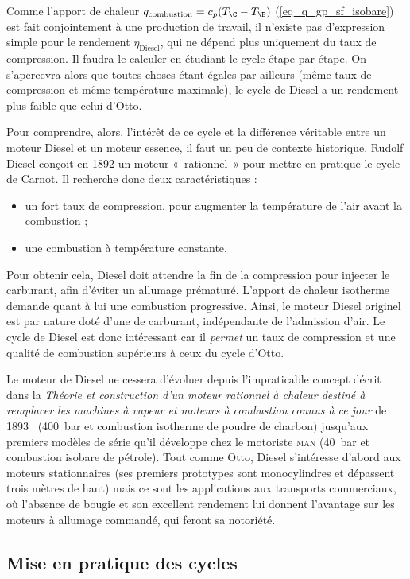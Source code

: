 		Comme l’apport de chaleur $q_\text{combustion} = c_p (T_\C - T_\B)$ (\ref{eq_q_gp_sf_isobare}) est fait conjointement à une production de travail, il n’existe pas d’expression simple pour le rendement $\eta_\text{Diesel}$, qui ne dépend plus uniquement du taux de compression. Il faudra le calculer en étudiant le cycle étape par étape. On s’apercevra alors que toutes choses étant égales par ailleurs (même taux de compression et même température maximale), le cycle de Diesel a un rendement plus faible que celui d’Otto.
		
		Pour comprendre, alors, l’intérêt de ce cycle et la différence véritable entre un moteur Diesel et un moteur essence, il faut un peu de contexte historique. Rudolf Diesel conçoit en 1892 un moteur «~rationnel~» pour mettre en pratique le cycle de Carnot. Il recherche donc deux caractéristiques :
		\begin{itemize}
			\item un fort taux de compression, pour augmenter la température de l’air avant la combustion ;
			\item une combustion à température constante.
		\end{itemize}
		Pour obtenir cela, Diesel doit attendre la fin de la compression pour injecter le carburant, afin d’éviter un allumage prématuré. L’apport de chaleur isotherme demande quant à lui une combustion progressive. Ainsi, le moteur Diesel originel est par nature doté d’une  de carburant, indépendante de l’admission d’air. Le cycle de Diesel est donc intéressant car il \emph{permet} un taux de compression et une qualité de combustion supérieurs à ceux du cycle d’Otto.
		
		Le moteur de Diesel ne cessera d’évoluer depuis l’impraticable concept décrit dans la \textit{Théorie et construction d’un moteur rationnel à chaleur destiné à remplacer les machines à vapeur et moteurs à combustion connus à ce jour} de 1893~\cite{diesel1893,diesel1893en} (\SI{400}{\bar} et combustion isotherme de poudre de charbon) jusqu’aux premiers modèles de série qu’il développe chez le motoriste \textsc{man} (\SI{40}{\bar} et combustion isobare de pétrole). Tout comme Otto, Diesel s’intéresse d’abord aux moteurs stationnaires (ses premiers prototypes sont monocylindres et dépassent trois mètres de haut) mais ce sont les applications aux transports commerciaux, où l’absence de bougie et son excellent rendement lui donnent l’avantage sur les moteurs à allumage commandé, qui feront sa notoriété.

	\subsection{Mise en pratique des cycles}
	\label{ch_cycles_pistons_reels}


